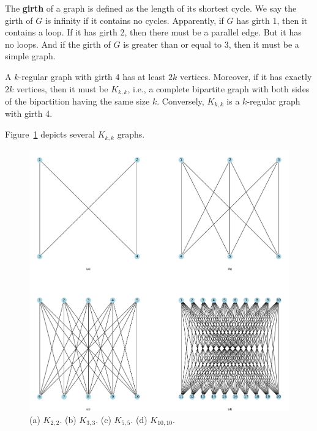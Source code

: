 \documentclass[thmcnt=section, 12pt, color=cyan]{my-elegantbook}
\begin{document}
\begin{theorem} \label{thm:1}
\end{theorem}


The \textbf{girth} of a graph is defined as 
the length of its shortest cycle.
We say the girth of $G$ is infinity if it contains no cycles.
Apparently, if $G$ has girth 1, then it contains a loop.
If it has girth 2, then there must be a parallel edge. 
But it has no loops.
And if the girth of $G$ is greater than or equal to 3,
then it must be a simple graph.

\begin{proposition}\label{pro:3}
	A $k$-regular graph with girth 4 has at least $2k$ vertices.
	Moreover, if it has exactly  $2k$ vertices, 
	then it must be $K_{k,k}$, i.e.,
	a complete bipartite graph with both sides of 
	the bipartition having the same size $k$.
	Conversely, $K_{k,k}$ is a $k$-regular graph with girth 4.
\end{proposition}

Figure~\ref{fig:3} depicts several $K_{k,k}$ graphs.

\begin{figure}[ht]
    \centering
    \includegraphics[scale=0.5]{figures/g-003.png}
	\caption{(a) $K_{2,2}$. (b) $K_{3,3}$. (c)  $K_{5,5}$. 
	(d)  $K_{10,10}$.}
    \label{fig:3}
\end{figure}
\end{document}
